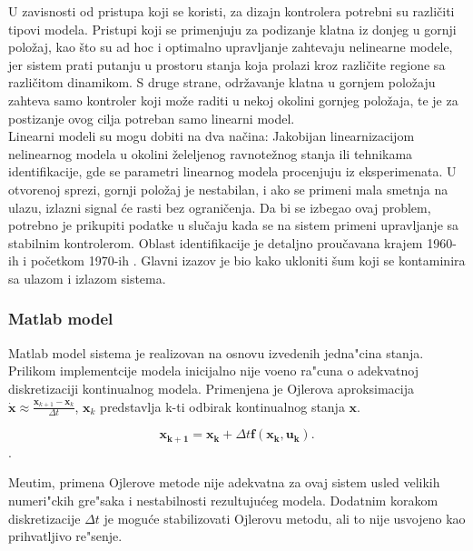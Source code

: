\documentclass[a4paper,11pt]{article}
\theoremstyle{definition} \newtheorem{deff}{Definicija}[section]
\theoremstyle{definition} \newtheorem{prim}[deff]{Primer}
\theoremstyle{plain} \newtheorem{teor}[deff]{Teorema}
\newcommand{\vect}[1]{\boldsymbol{\mathbf{#1}}}
\begin{document}
	U zavisnosti od pristupa koji se koristi, za dizajn kontrolera potrebni su različiti tipovi modela. Pristupi koji se primenjuju za podizanje klatna iz donjeg u gornji položaj, kao što su ad hoc i optimalno upravljanje zahtevaju nelinearne modele, jer sistem prati putanju u prostoru stanja koja prolazi kroz različite regione sa različitom dinamikom. S druge strane, održavanje klatna u gornjem položaju zahteva samo kontroler koji može raditi u nekoj okolini gornjeg položaja, te je za postizanje ovog cilja potreban samo linearni model.  \\
	
	Linearni modeli su mogu dobiti na dva načina: Jakobijan linearnizacijom nelinearnog modela u okolini želeljenog ravnotežnog stanja ili tehnikama identifikacije, gde se parametri linearnog modela procenjuju iz eksperimenata. U otvorenoj sprezi, gornji položaj je nestabilan, i ako se primeni mala smetnja na ulazu, izlazni signal će rasti bez ograničenja. Da bi se izbegao ovaj problem, potrebno je prikupiti podatke u slučaju kada se na sistem primeni upravljanje sa stabilnim kontrolerom.  Oblast identifikacije je detaljno proučavana krajem 1960-ih i početkom 1970-ih  \cite{identifikacija}. Glavni izazov je bio kako ukloniti šum koji se kontaminira sa ulazom i izlazom sistema.  \\
	
	
	
	\clearpage
	
	\subsubsection{Matlab model}\label{sec:matlab_model}
	
	Matlab model sistema je realizovan na osnovu izvedenih jedna"cina stanja. Prilikom implementcije modela inicijalno nije vo\dj eno ra"cuna o adekvatnoj diskretizaciji kontinualnog modela. Primenjena je Ojlerova aproksimacija $\dot{\mathbf{x}} \approx \frac{\mathbf{x}_{k+1} - \mathbf{x}_{k}}{\Delta t}$, $\mathbf{x}_{k}$ predstavlja k-ti odbirak kontinualnog stanja $\mathbf{x}$.
	
	\begin{equation} \label{eq:Ojler}
		\vect{x_{k+1}} = \vect{x_{k}} + \Delta t \vect{f}(\vect{x_k}, \vect{u_k}).
	\end{equation}.
	
	Me\dj utim, primena Ojlerove metode nije adekvatna za ovaj sistem usled velikih numeri"ckih gre"saka i nestabilnosti rezultuju\'ceg modela. Dodatnim korakom diskretizacije $\Delta t$ je mogu\'ce stabilizovati Ojlerovu metodu, ali to nije usvojeno kao prihvatljivo re"senje.\\
	
\end{document}
